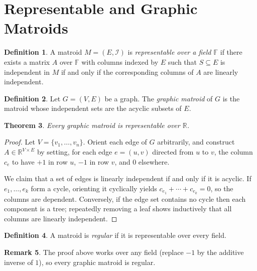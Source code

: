 \documentclass[11pt]{article}
\theoremstyle{plain}
\newtheorem{theorem}{Theorem}[section]
\theoremstyle{definition}
\newtheorem{definition}[theorem]{Definition}
\newtheorem{remark}[theorem]{Remark}
\begin{document}
\section{Representable and Graphic Matroids}
 
\begin{definition}
A matroid $M = (E, \mathcal{I})$ is \emph{representable over a field
$\mathbb{F}$} if there exists a matrix $A$ over $\mathbb{F}$ with columns
indexed by $E$ such that $S \subseteq E$ is independent in $M$ if and only if
the corresponding columns of $A$ are linearly independent.
\end{definition}
 
\begin{definition}
Let $G = (V,E)$ be a graph.
The \emph{graphic matroid} of $G$ is the matroid whose independent sets are
the acyclic subsets of $E$.
\end{definition}
 
\begin{theorem}
Every graphic matroid is representable over $\mathbb{R}$.
\end{theorem}
 
\begin{proof}
Let $V = \{v_1, \dots, v_n\}$.
Orient each edge of $G$ arbitrarily, and construct
$A \in \mathbb{R}^{V \times E}$ by setting, for each edge $e = (u,v)$
directed from $u$ to $v$, the column $c_e$ to have $+1$ in row $u$,
$-1$ in row $v$, and $0$ elsewhere.
 
We claim that a set of edges is linearly independent if and only if it
is acyclic.
If $e_1, \dots, e_k$ form a cycle, orienting it cyclically yields
$c_{e_1} + \cdots + c_{e_k} = 0$, so the columns are dependent.
Conversely, if the edge set contains no cycle then each component is a
tree; repeatedly removing a leaf shows inductively that all columns are
linearly independent.
\end{proof}
 
\begin{definition}
A matroid is \emph{regular} if it is representable over every field.
\end{definition}
 
\begin{remark}
The proof above works over any field (replace $-1$ by the additive inverse
of $1$), so every graphic matroid is regular.
\end{remark}
 
\end{document}
